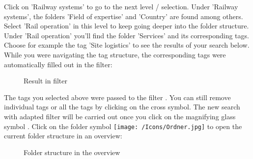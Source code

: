 Click on 'Railway systems'  to go to the next level / selection. Under 'Railway systems', the folders 'Field of expertise' and 'Country' are found among others. Select 'Rail operation'  in this level to keep going deeper into the folder structure. Under 'Rail operation' you'll find the folder 'Services' and its corresponding tags. Choose for example the tag 'Site logistics'  to see the results of your search below. While you were navigating the tag structure, the corresponding tags were automatically filled out in the filter:

\begin{figure}[H]
\caption{Result in filter}
\end{figure}

The tags you selected above were passed to the filter . You can still remove individual tags or all the tags by clicking on the cross symbol. The new search with adapted filter will be carried out once you click on the magnifying glass symbol . Click on the folder symbol \texttt{[image: /Icons/Ordner.jpg]}  to open the current folder structure in an overview: 

\begin{figure}[H]
\caption{Folder structure in the overview}
\end{figure}

